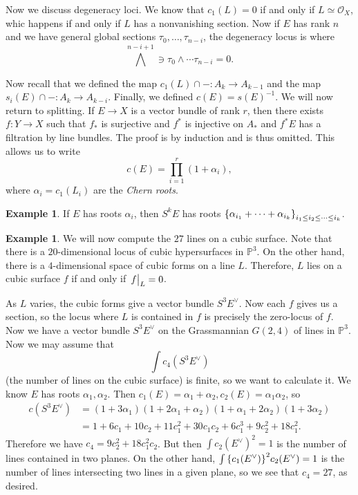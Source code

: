 \documentclass[leqno, openany]{memoir}
\theoremstyle{definition}
\newtheorem{exm}[thm]{Example}
\theoremstyle{remark}
\theoremstyle{plain}
\theoremstyle{definition}
\theoremstyle{remark}
\renewcommand{\P}{\mathbb{P}}
\newcommand{\mc}[1]{\mathcal{#1}}
\begin{document}
Now we discuss degeneracy loci. We know that $c_1(L) = 0$ if and only if $L
\simeq \mc{O}_X$, whic happens if and only if $L$ has a nonvanishing section.
Now if $E$ has rank $n$ and we have general global sections $\tau_0, \ldots,
\tau_{n-i}$, the degeneracy locus is where \[ {\bigwedge}^{n-i+1} \ni \tau_0
\wedge \cdots \tau_{n-i} = 0. \]

Now recall that we defined the map $c_1(L) \cap - \colon A_k \to A_{k-1}$ and
the map $s_i(E) \cap - \colon A_k \to A_{k-i}$. Finally, we defined $c(E) =
{s(E)}^{-1}$. We will now return to splitting. If $E \to X$ is a vector bundle
of rank $r$, then there exists $f \colon Y \to X$ such that $f_*$ is surjective
and $f^*$ is injective on $A_*$ and $f^* E$ has a filtration by line bundles.
The proof is by induction and is thus omitted. This allows us to write \[ c(E)
= \prod_{i=1}^r (1 + \alpha_i), \] where $\alpha_i = c_1(L_i)$ are the
\textit{Chern roots}.

\begin{exm} If $E$ has roots $\alpha_i$, then $S^k E$ has roots
$\qty{\alpha_{i_1} + \cdots + \alpha_{i_k}}_{i_1 \leq i_2 \leq \cdots \leq
i_k}$.  \end{exm}

\begin{exm} We will now compute the $27$ lines on a cubic surface. Note that
    there is a $20$-dimensional locus of cubic hypersurfaces in $\P^3$. On the
    other hand, there is a $4$-dimensional space of cubic forms on a line $L$.
    Therefore, $L$ lies on a cubic surface $f$ if and only if $\eval{f}_L = 0$.

    As $L$ varies, the cubic forms give a vector bundle $S^3 E^{\vee}$. Now
    each $f$ gives us a section, so the locus where $L$ is contained in $f$ is
    precisely the zero-locus of $f$. Now we have a vector bundle $S^3 E^{\vee}$
    on the Grassmannian $G(2,4)$ of lines in $\P^3$. Now we may assume that \[
    \int c_4(S^3 E^{\vee}) \] (the number of lines on the cubic surface) is
    finite, so we want to calculate it. We know $E$ has roots $\alpha_1,
    \alpha_2$. Then $c_1(E) = \alpha_1 + \alpha_2, c_2(E) =\alpha_1 \alpha_2$,
    so \begin{align*} c(S^3 E^{\vee}) &= (1+ 3 \alpha_1) (1 + 2 \alpha_1 +
        \alpha_2) (1 + \alpha_1 + 2 \alpha_2) (1+3 \alpha_2) \\ &= 1 + 6 c_1 +
    10 c_2 + 11c_1^2 + 30 c_1c_2 + 6 c_1^3 + 9 c_2^2 + 18 c_1^2.  \end{align*}
    Therefore we have $c_4 = 9 c_2^2 + 18c_1^2 c_2$. But then $\int { c_2
    (E^{\vee}) }^2 = 1$ is the number of lines contained in two planes. On the
    other hand, $\int \qty{c_1(E^{\vee})}^2 c_2(E^{\vee}) = 1$ is the number of
    lines intersecting two lines in a given plane, so we see that $c_4 = 27$,
    as desired.  \end{exm}
\end{document}
